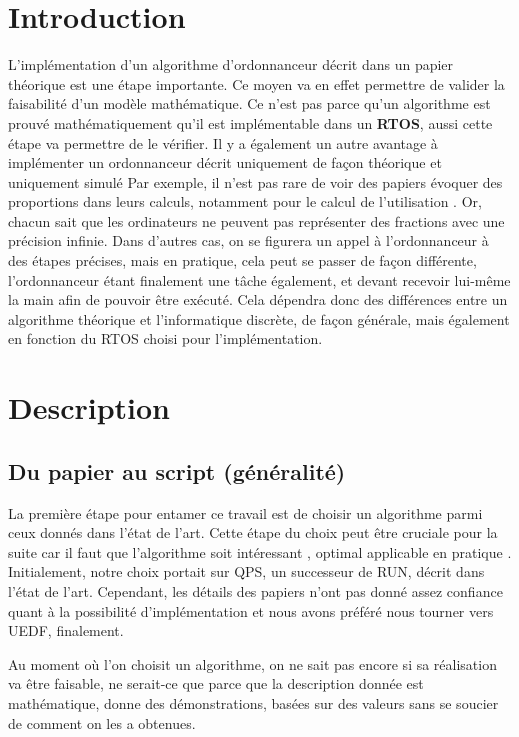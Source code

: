\section{Introduction}

L'implémentation d'un algorithme d'ordonnanceur décrit dans un papier théorique 
est une étape importante. 
Ce moyen va en effet permettre de valider la faisabilité d'un modèle 
mathématique.
Ce n'est pas parce qu'un algorithme est prouvé mathématiquement 
qu'il est implémentable dans un \textbf{RTOS}, aussi cette étape va permettre de le vérifier.
Il y a également un autre avantage à implémenter un ordonnanceur décrit uniquement 
de façon théorique et uniquement simulé
Par exemple, il n'est pas rare de voir des papiers évoquer des proportions 
dans leurs calculs, notamment pour le calcul de l'utilisation .
Or, chacun sait que les ordinateurs ne peuvent 
pas représenter des fractions avec une précision infinie. 
Dans d'autres cas, on se figurera un appel à l'ordonnanceur à des étapes 
précises, mais en pratique, cela peut se passer de façon différente, 
l'ordonnanceur étant finalement une tâche également, et devant recevoir 
lui-même la main afin de pouvoir être exécuté. Cela dépendra donc des 
différences entre un algorithme théorique et l'informatique discrète, de 
façon générale, mais également en fonction du RTOS choisi pour l'implémentation.





\section{Description}
	\subsection{Du papier au script (généralité)}
	La première étape pour entamer ce travail est de choisir un algorithme parmi ceux donnés dans l'état de l'art.
	Cette étape du choix peut être cruciale pour la suite car il faut que l'algorithme soit 
	intéressant ,
	optimal 
	applicable en pratique .
	Initialement, notre choix portait sur QPS, un 
	successeur de RUN, décrit dans l'état de l'art. Cependant, les détails des papiers n'ont pas donné 
	assez confiance quant à la possibilité d'implémentation et nous avons préféré nous tourner vers UEDF, finalement.
	
	
	Au moment où l'on choisit un algorithme, on ne sait pas encore si sa réalisation va être faisable, 
	ne serait-ce que parce que la description donnée est mathématique, donne des démonstrations, 
	basées sur des valeurs sans se soucier de comment on les a obtenues.
	
